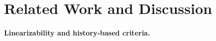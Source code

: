 
\section{Related Work and Discussion}
\label{sec:related}




\paragraph{Linearizability and history-based criteria.}


